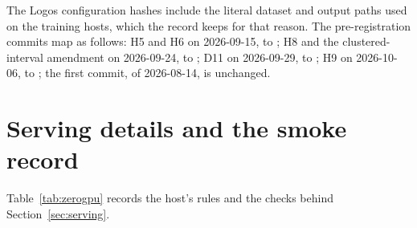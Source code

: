 The Logos configuration hashes include the literal dataset and output paths used on the training hosts, which the record keeps for that reason. The pre-registration commits map as follows: H5 and H6 on 2026-09-15,  to ; H8 and the clustered-interval amendment on 2026-09-24,  to ; D11 on 2026-09-29,  to ; H9 on 2026-10-06,  to ; the first commit,  of 2026-08-14, is unchanged.

\section{Serving details and the smoke record}\label{app:serving}
Table~\ref{tab:zerogpu} records the host's rules and the checks behind Section~\ref{sec:serving}.
